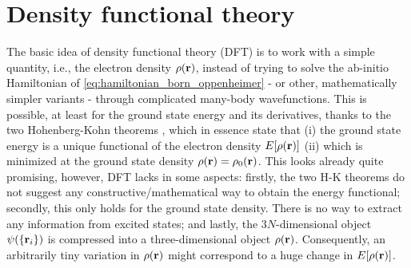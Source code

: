 \documentclass[\main/main.tex]{subfiles}
\begin{document}
\section{Density functional theory}\label{sec:dft}

The basic idea of density functional theory (DFT) is to work with a simple quantity, i.e., the electron density $\rho(\textbf{r})$, instead of trying to solve the ab-initio Hamiltonian of \eqref{eq:hamiltonian_born_oppenheimer} - or other, mathematically simpler variants - through complicated many-body wavefunctions. This is possible, at least for the ground state energy and its derivatives, thanks to the two Hohenberg-Kohn theorems \cite{Hohenberg1964}, which in essence state that (i) the ground state energy is a unique functional of the electron density $E[\rho(\textbf{r})]$ (ii) which is minimized at the ground state density $\rho(\textbf{r})=\rho_0(\textbf{r})$. This looks already quite promising, however, DFT lacks in some aspects: firstly, the two H-K theorems do not suggest any constructive/mathematical way to obtain the energy functional; secondly, this only holds for the ground state density. There is no way to extract any information from excited states; and lastly, the $3N$-dimensional object $\psi(\{\textbf{r}_i\})$ is compressed into a three-dimensional object $\rho(\textbf{r})$. Consequently, an arbitrarily tiny variation in $\rho(\textbf{r})$ might correspond to a huge change in $E[\rho(\textbf{r})]$.
\end{document}
